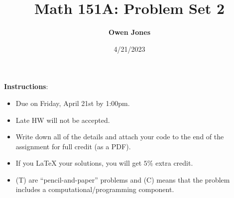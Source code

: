 \documentclass[10pt]{article}
\title{\bf Math 151A: Problem Set 2}
\date{4/21/2023}
\author{\bf Owen Jones}
\begin{document}
\maketitle


{\small \textbf{Instructions}:
\begin{itemize}
\item Due on Friday, April 21st by 1:00pm.
\item Late HW will not be accepted.
\item Write down all of the details and attach your code to the end of the assignment for full credit (as a PDF).  
\item If you LaTeX your solutions, you will get $5\%$ extra credit. 
\item (T) are ``pencil-and-paper'' problems and (C) means that the problem includes a computational/programming component. 
\end{itemize}}

\end{document}
